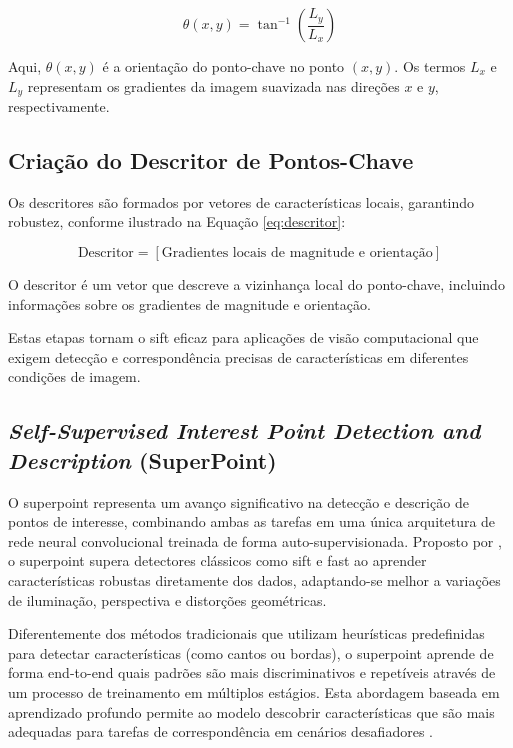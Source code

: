 \begin{equation}
\theta(x, y) = \tan^{-1}\left(\frac{L_y}{L_x}\right)
    \label{eq:pc2}
\end{equation}

Aqui, \(\theta(x, y)\) é a orientação do ponto-chave no ponto \((x, y)\). Os termos \(L_x\) e \(L_y\) representam os gradientes da imagem suavizada nas direções \(x\) e \(y\), respectivamente.

\subsection*{Criação do Descritor de Pontos-Chave}
Os descritores são formados por vetores de características locais, garantindo robustez, conforme ilustrado na Equação \ref{eq:descritor}:

\begin{equation}
    \text{Descritor} = \left[\text{Gradientes locais de magnitude e orientação}\right]
    \label{eq:descritor}
\end{equation}

O descritor é um vetor que descreve a vizinhança local do ponto-chave, incluindo informações sobre os gradientes de magnitude e orientação.

Estas etapas tornam o \gls{sift} eficaz para aplicações de visão computacional que exigem detecção e correspondência precisas de características em diferentes condições de imagem.


\subsection{\textit{Self-Supervised Interest Point Detection and Description} (SuperPoint)}\label{subsec:superpoint}

O \gls{superpoint} representa um avanço significativo na detecção e descrição de pontos de interesse, combinando ambas as tarefas em uma única arquitetura de rede neural convolucional treinada de forma auto-supervisionada. Proposto por , o \gls{superpoint} supera detectores clássicos como \gls{sift} e \gls{fast} ao aprender características robustas diretamente dos dados, adaptando-se melhor a variações de iluminação, perspectiva e distorções geométricas.

Diferentemente dos métodos tradicionais que utilizam heurísticas predefinidas para detectar características (como cantos ou bordas), o \gls{superpoint} aprende de forma end-to-end quais padrões são mais discriminativos e repetíveis através de um processo de treinamento em múltiplos estágios. Esta abordagem baseada em aprendizado profundo permite ao modelo descobrir características que são mais adequadas para tarefas de correspondência em cenários desafiadores \cite{DeTone2018}.

